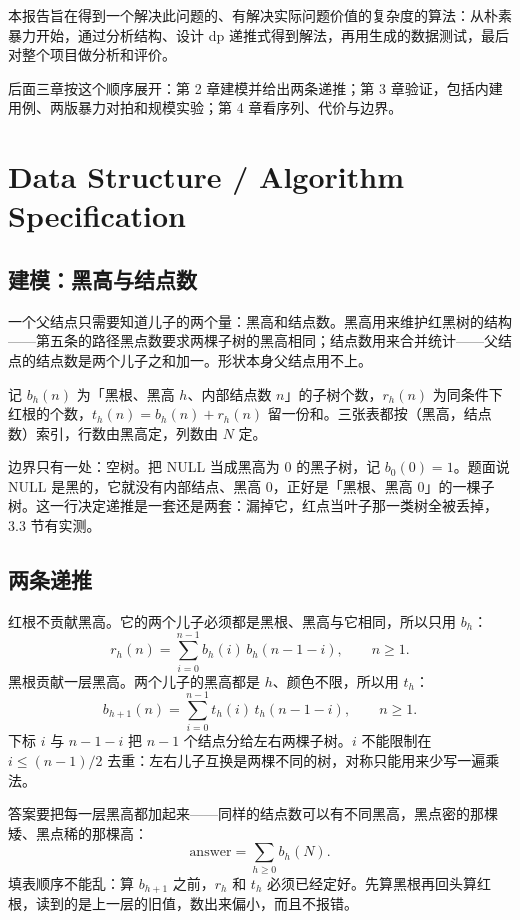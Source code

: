 \documentclass[12pt,a4paper,fontset=windows]{ctexart}
\begin{document}
本报告旨在得到一个解决此问题的、有解决实际问题价值的复杂度的算法：从朴素暴力开始，通过分析结构、设计 dp 递推式得到解法，再用生成的数据测试，最后对整个项目做分析和评价。

后面三章按这个顺序展开：第 2 章建模并给出两条递推；第 3 章验证，包括内建用例、两版暴力对拍和规模实验；第 4 章看序列、代价与边界。

\section{Data Structure / Algorithm Specification}

\subsection{建模：黑高与结点数}

一个父结点只需要知道儿子的两个量：黑高和结点数。黑高用来维护红黑树的结构——第五条的路径黑点数要求两棵子树的黑高相同；结点数用来合并统计——父结点的结点数是两个儿子之和加一。形状本身父结点用不上。

记 $b_h(n)$ 为「黑根、黑高 $h$、内部结点数 $n$」的子树个数，$r_h(n)$ 为同条件下红根的个数，$t_h(n)=b_h(n)+r_h(n)$ 留一份和。三张表都按（黑高，结点数）索引，行数由黑高定，列数由 $N$ 定。

边界只有一处：空树。把 NULL 当成黑高为 0 的黑子树，记 $b_0(0)=1$。题面说 NULL 是黑的，它就没有内部结点、黑高 0，正好是「黑根、黑高 0」的一棵子树。这一行决定递推是一套还是两套：漏掉它，红点当叶子那一类树全被丢掉，3.3 节有实测。

\subsection{两条递推}

红根不贡献黑高。它的两个儿子必须都是黑根、黑高与它相同，所以只用 $b_h$：
\[
r_h(n)=\sum_{i=0}^{n-1} b_h(i)\,b_h(n-1-i),\qquad n\ge 1 .
\]
黑根贡献一层黑高。两个儿子的黑高都是 $h$、颜色不限，所以用 $t_h$：
\[
b_{h+1}(n)=\sum_{i=0}^{n-1} t_h(i)\,t_h(n-1-i),\qquad n\ge 1 .
\]
下标 $i$ 与 $n-1-i$ 把 $n-1$ 个结点分给左右两棵子树。$i$ 不能限制在 $i\le (n-1)/2$ 去重：左右儿子互换是两棵不同的树，对称只能用来少写一遍乘法。

答案要把每一层黑高都加起来——同样的结点数可以有不同黑高，黑点密的那棵矮、黑点稀的那棵高：
\[
\text{answer}=\sum_{h\ge 0} b_h(N).
\]
填表顺序不能乱：算 $b_{h+1}$ 之前，$r_h$ 和 $t_h$ 必须已经定好。先算黑根再回头算红根，读到的是上一层的旧值，数出来偏小，而且不报错。
\end{document}
